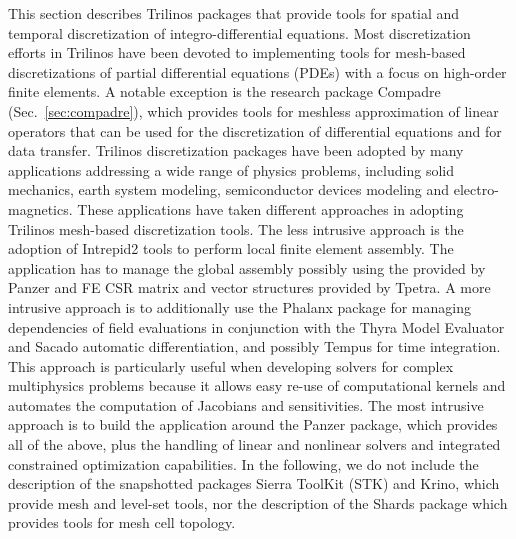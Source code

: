 
This section describes Trilinos packages that provide tools for spatial and temporal discretization of integro-differential equations. Most discretization efforts in Trilinos have been devoted to implementing tools for mesh-based discretizations of partial differential equations (PDEs) with a focus on high-order finite elements. A notable exception is the research package Compadre (Sec.~\ref{sec:compadre}), which provides tools for meshless approximation of linear operators that can be used for the discretization of differential equations and for data transfer.
Trilinos discretization packages have been adopted by many applications addressing a wide range of physics problems, including solid mechanics, earth system modeling, semiconductor devices modeling and electro-magnetics. These applications have taken different approaches in adopting Trilinos mesh-based discretization tools. The less intrusive approach is the adoption of Intrepid2 tools to perform local finite element assembly. The application has to manage the global assembly possibly using the  provided by Panzer and FE CSR matrix and vector structures provided by Tpetra.
A more intrusive approach is to additionally use the Phalanx package for managing dependencies of field evaluations in conjunction with the Thyra Model Evaluator and Sacado automatic differentiation, and possibly Tempus for time integration. This approach is particularly useful when developing solvers for complex multiphysics problems because it allows easy re-use of computational kernels and automates the computation of Jacobians and sensitivities.
The most intrusive approach is to build the application around the Panzer package, which provides all of the above, plus the handling of linear and nonlinear solvers and integrated constrained optimization capabilities.
In the following, we do not include the description of the snapshotted packages Sierra ToolKit (STK) and Krino, which provide mesh and level-set tools, nor the description of the Shards package which provides tools for mesh cell topology.

